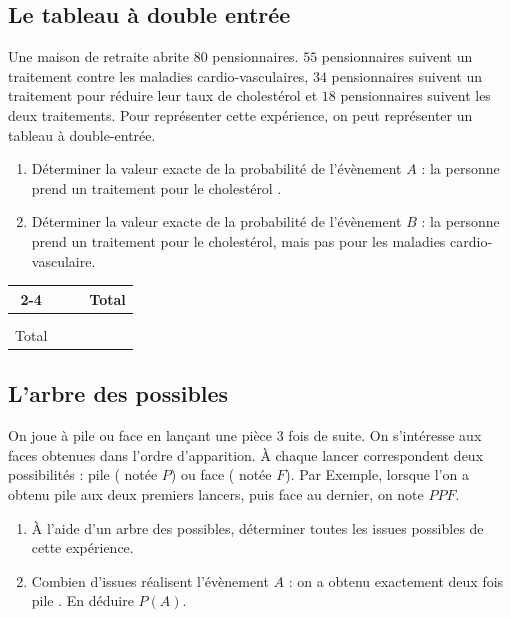 \subsection{Le tableau à double entrée}
\noindent Une maison de retraite abrite $80$ pensionnaires. $55$ pensionnaires suivent un traitement contre les maladies cardio-vasculaires, $34$ pensionnaires suivent un traitement pour réduire leur taux de cholestérol et $18$ pensionnaires suivent les deux traitements. Pour représenter cette expérience, on peut représenter un tableau à double-entrée.
\begin{enumerate}
\item Déterminer la valeur exacte de la probabilité de l'évènement $A$ : \og la personne prend un traitement pour le cholestérol \fg{}. 
\item Déterminer la valeur exacte de la probabilité de l'évènement $B$ : \og la personne prend un traitement pour le cholestérol, mais pas pour les maladies cardio-vasculaire\fg{}.
\end{enumerate}
\begin{center}\begin{tabular}{|c|c|c|c|} 
\cline{2-4}  
\multicolumn{1}{c|}{} &\phantom{ Cardio-vasculaire} & \phantom{Non cardio-vasculaire} & Total \\  
\hline 
\phantom{Cholestérol} &  &  &  \\  
\hline 
\phantom{Non cholestérol} &  &  &  \\  
\hline 
Total &  &  &  \\ 
\hline
\end{tabular}
\end{center}
\vspace{0.3cm}

\ligne

\ligne

\ligne

\ligne

\ligne

\ligne

\ligne

\ligne

\newpage

\subsection{L'arbre des possibles}

\noindent On joue à pile ou face en lançant une pièce 3 fois de suite. On s'intéresse aux faces obtenues dans l'ordre d'apparition. À chaque lancer correspondent deux possibilités : pile ( notée $P$) ou face
( notée $F$). Par Exemple, lorsque l'on a obtenu pile aux deux premiers lancers, puis face au dernier, on note $PPF$.
\begin{enumerate}
\item À l'aide d'un arbre des possibles, déterminer toutes les issues possibles de cette expérience.
\item Combien d'issues réalisent l'évènement $A$ : \og on a obtenu exactement deux fois pile \fg{}. En déduire $P(A)$.
\end{enumerate}

